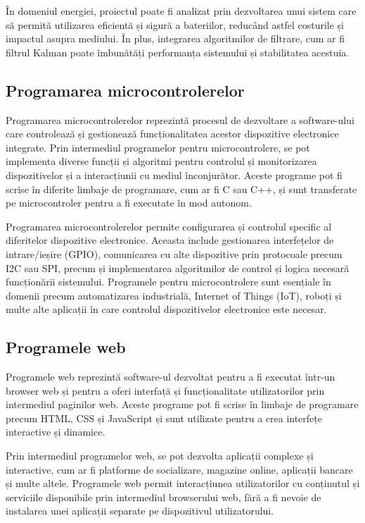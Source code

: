 În domeniul energiei, proiectul poate fi analizat prin dezvoltarea unui sistem care să permită utilizarea eficientă și sigură a bateriilor, reducând astfel costurile și impactul asupra mediului. În plus, integrarea algoritmilor de filtrare, cum ar fi filtrul Kalman poate îmbunătăți performanța sistemului și stabilitatea acestuia.

\subsection{Programarea microcontrolerelor}

Programarea microcontrolerelor reprezintă procesul de dezvoltare a software-ului care controlează și gestionează funcționalitatea acestor dispozitive electronice integrate. Prin intermediul programelor pentru microcontrolere, se pot implementa diverse funcții și algoritmi pentru controlul și monitorizarea dispozitivelor și a interacțiunii cu mediul înconjurător. Aceste programe pot fi scrise în diferite limbaje de programare, cum ar fi C sau C++, și sunt transferate pe microcontroler pentru a fi executate în mod autonom.

Programarea microcontrolerelor permite configurarea și controlul specific al diferitelor dispozitive electronice. Aceasta include gestionarea interfețelor de intrare/ieșire (GPIO), comunicarea cu alte dispozitive prin protocoale precum I2C sau SPI, precum și implementarea algoritmilor de control și logica necesară funcționării sistemului. Programele pentru microcontrolere sunt esențiale în domenii precum automatizarea industrială, Internet of Things (IoT), roboți și multe alte aplicații în care controlul dispozitivelor electronice este necesar.

\subsection{Programele web}

Programele web reprezintă software-ul dezvoltat pentru a fi executat într-un browser web și pentru a oferi interfață și funcționalitate utilizatorilor prin intermediul paginilor web. Aceste programe pot fi scrise în limbaje de programare precum HTML, CSS și JavaScript și sunt utilizate pentru a crea interfețe interactive și dinamice.

Prin intermediul programelor web, se pot dezvolta aplicații complexe și interactive, cum ar fi platforme de socializare, magazine online, aplicații bancare și multe altele. Programele web permit interacțiunea utilizatorilor cu conținutul și serviciile disponibile prin intermediul browserului web, fără a fi nevoie de instalarea unei aplicații separate pe dispozitivul utilizatorului.

